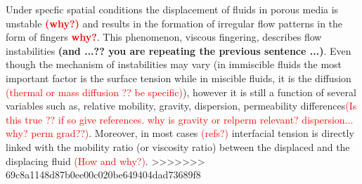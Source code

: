 \documentclass[preprint,authoryear,12pt]{elsarticle}
\newcommand{\red}{\textcolor{red}}
\begin{document}

Under specfic spatial conditions the displacement of fluids in porous media is unstable \red{{\bf(why?)}} and results in the formation of irregular flow patterns in the form of fingers \red{\bf why?}. This phenomenon, viscous fingering, describes flow instabilities {\bf (and ...?? you are repeating the previous sentence ...)}. Even though the mechanism of instabilities may vary (in immiscible fluids the most important factor is the surface tension while in miscible fluids, it is the diffusion \red{(thermal or mass diffusion ?? be specific)}), however it is still a function of several variables such as, relative mobility, gravity, dispersion, permeability differences\red{(Is this true ?? if so give references. why is gravity or relperm relevant? dispersion... why? perm grad??)}. Moreover, in most cases \red{(refs?)} interfacial tension is directly linked with the mobility ratio (or viscosity ratio) between the displaced and the displacing fluid \red{(How and why?)}.
\medskip
>>>>>>> 69c8a1148d87b0ee00c020be649404dad73689f8
\end{document}
